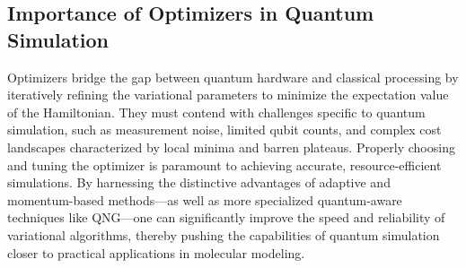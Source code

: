 \subsection{Importance of Optimizers in Quantum Simulation}
\label{subsec:importance_optimizers}
Optimizers bridge the gap between quantum hardware and classical processing by iteratively refining the variational parameters to minimize the expectation value of the Hamiltonian. They must contend with challenges specific to quantum simulation, such as measurement noise, limited qubit counts, and complex cost landscapes characterized by local minima and barren plateaus. Properly choosing and tuning the optimizer is paramount to achieving accurate, resource-efficient simulations. By harnessing the distinctive advantages of adaptive and momentum-based methods---as well as more specialized quantum-aware techniques like QNG---one can significantly improve the speed and reliability of variational algorithms, thereby pushing the capabilities of quantum simulation closer to practical applications in molecular modeling.
